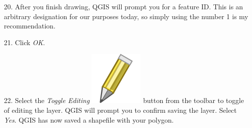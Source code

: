\documentclass[oneside,a4paper,11pt,explicit]{book}
\begin{document}
	
	20. After you finish drawing, QGIS will prompt you for a feature ID. This is an arbitrary designation for our purposes today, so simply using the number 1 is my recommendation. 
	
	21. Click \textit{OK}. 
	
	22. Select the \textit{Toggle Editing} \includegraphics[height=\fontcharht\font`\B]{mActionToggleEditing.png} button from the toolbar to toggle of editing the layer. QGIS will prompt you to confirm saving the layer. Select \textit{Yes}. QGIS has now saved a shapefile with your polygon. 
	
	\vspace{.5em}
	
\end{document}
